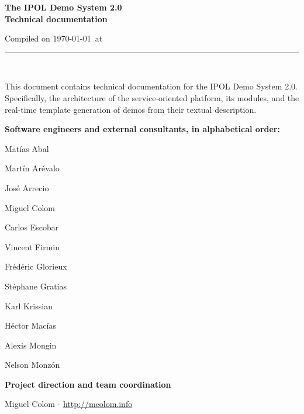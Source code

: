 \documentclass[a4paper,12pt]{article}
\begin{document}
\begin{titlepage}

\begin{center}
\vspace*{-1in}

\vspace*{0.6in}
\begin{Large}
\textbf{The IPOL Demo System 2.0 \\Technical documentation} \\
\end{Large}

\vspace*{0.6in}

\small{Compiled on \today\ at \currenttime}

\vspace*{0.6in}
\rule{80mm}{0.1mm}\\
\vspace*{0.1in}
\end{center}

\end{titlepage}

This document contains technical documentation for the IPOL Demo System 2.0. Specifically, the architecture of the service-oriented platform, its modules, and the real-time template generation of demos from their textual description.
\vspace*{0.6in}

\textbf{Software engineers and external consultants, in alphabetical order:}

Matías Abal

Martín Arévalo

José Arrecio

Miguel Colom

Carlos Escobar

Vincent Firmin

Frédéric Glorieux

Stéphane Gratias

Karl Krissian

Héctor Macías

Alexis Mongin

Nelson Monzón

\vspace*{0.2in}

\textbf{Project direction and team coordination}

Miguel Colom - \url{http://mcolom.info}



\newpage
\end{document}
